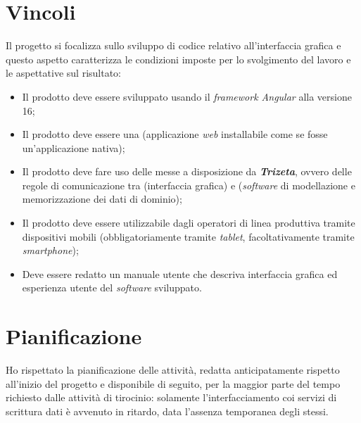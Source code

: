 \section{Vincoli}

Il progetto si focalizza sullo sviluppo di codice relativo all'interfaccia grafica e questo aspetto caratterizza le condizioni imposte per lo svolgimento del lavoro e le aspettative sul risultato:
\begin{itemize}
    \item Il prodotto deve essere sviluppato usando il \textit{framework Angular} alla versione 16;
    \item Il prodotto deve essere una  (applicazione \textit{web} installabile come se fosse un'applicazione nativa);
    \item Il prodotto deve fare uso delle  messe a disposizione da \textit{\textbf{Trizeta}}, ovvero delle regole di comunicazione tra  (interfaccia grafica) e  (\textit{software} di modellazione e memorizzazione dei dati di dominio);
    \item Il prodotto deve essere utilizzabile dagli operatori di linea produttiva tramite dispositivi mobili (obbligatoriamente tramite \textit{tablet}, facoltativamente tramite \textit{smartphone});
    \item Deve essere redatto un manuale utente che  descriva interfaccia grafica ed esperienza utente del \textit{software} sviluppato.
\end{itemize}

\section{Pianificazione}
\label{sec:pianificazione}
Ho rispettato la pianificazione delle attività, redatta anticipatamente rispetto all'inizio del progetto e disponibile di seguito, per la maggior parte del tempo richiesto dalle attività di tirocinio: solamente l'interfacciamento coi servizi
di scrittura dati è avvenuto in ritardo, data l'assenza temporanea degli stessi.

